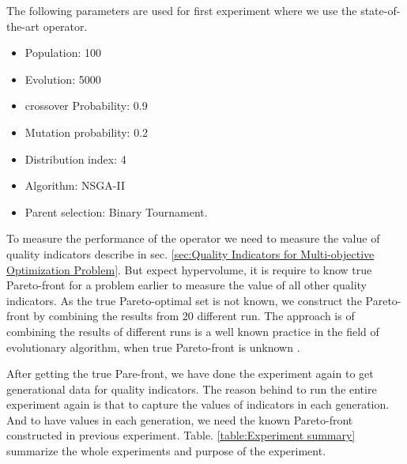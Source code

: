 \documentclass{article}
\begin{document}
The following parameters are used for first experiment where we use the state-of-the-art operator.

\begin{itemize}
\item Population: 100
\item Evolution: 5000
\item crossover Probability: 0.9
\item Mutation probability: 0.2
\item Distribution index: 4
\item Algorithm: NSGA-II
\item Parent selection: Binary Tournament.
\end{itemize}


To measure the performance of the operator we need to measure the value of quality indicators describe in sec. \ref{sec:Quality Indicators for Multi-objective Optimization Problem}.
But expect hypervolume, it is require to know true Pareto-front for a problem earlier to measure the value of all other quality indicators.
As the true Pareto-optimal set is not known, we construct the Pareto-front by combining the results from 20 different run. 
The approach is of combining the results of different runs is a well known practice in the field of evolutionary algorithm, when true Pareto-front is unknown \cite{Durillo_Nebro_Alba_2010}. 

After getting the true Pare-front, we have done the experiment again to get generational data for quality indicators. 
The reason behind to run the entire experiment again is that to capture the values of indicators in each generation.
And to have values in each generation, we need the known Pareto-front constructed in previous experiment.
Table. \ref{table:Experiment summary} summarize the whole experiments and purpose of the experiment.
\end{document}
